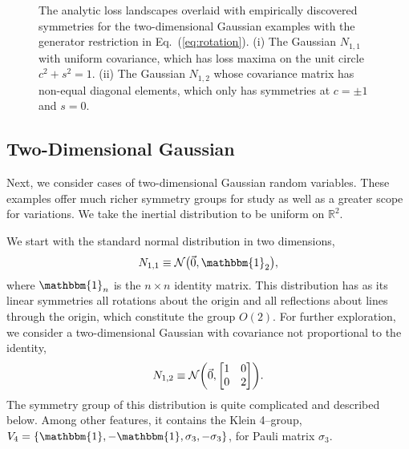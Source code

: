 \documentclass[aps,prx,reprint,preprintnumbers,superscriptaddress,nofootinbib,longbibliography,floatfix]{revtex4-1}
\newcommand{\R}{\mathbb{R}}
\DeclareRobustCommand{\Eq}[1]{Eq.~(\ref{eq:#1})}
\begin{document}
\begin{figure*}[t]
    \centering
    $\quad$
    \caption{
    The analytic loss landscapes overlaid with empirically discovered symmetries for the two-dimensional Gaussian examples with the generator restriction in \Eq{rotation}.
    (i) The Gaussian $N_{1,1}$ with uniform covariance, which has loss maxima on the unit circle $c^2 + s^2 = 1$.
(ii) The Gaussian $N_{1,2}$ whose covariance matrix has non-equal diagonal elements, which only has symmetries at $c = \pm 1$ and $s = 0$.
    }
    \label{fig:SO2}
\end{figure*}

\subsection{Two-Dimensional Gaussian}
\label{sec:2d_example}

Next, we consider cases of two-dimensional Gaussian random variables.
%
These examples offer much richer symmetry groups for study as well as a greater scope for variations.
%
We take the inertial distribution to be uniform on $\R^2$.


We start with the standard normal distribution in two dimensions,
%
\begin{equation}
N_{1,1}\equiv\mathcal{N}\qty(\vec{0},\mathbbm{1}_2),
\end{equation}
%
where $\mathbbm{1}_n$ is the $n\times n$ identity matrix.
%
This distribution has as its linear symmetries all rotations about the origin and all reflections about lines through the origin, which constitute the group $O(2)$.
%
For further exploration, we consider a two-dimensional Gaussian with covariance not proportional to the identity,
%
\begin{equation}
N_{1,2} \equiv \mathcal{N}\qty(\vec{0},\mqty[1&0\\0&2]).
\end{equation}
%
The symmetry group of this distribution is quite complicated and described below.
%
Among other features, it contains the Klein 4--group, $V_4 = \qty{\mathbbm{1}, -\mathbbm{1}, \sigma_3, -\sigma_3}$, for Pauli matrix $\sigma_3$.
\end{document}
